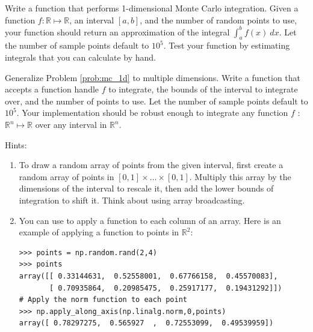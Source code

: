 \begin{problem}
\label{prob:mc_1d}
Write a function that performs 1-dimensional Monte Carlo integration. 
Given a function $f: \mathbb{R} \mapsto \mathbb{R}$, an interval ${[a,b]}$, and the number of random points to use, your function should return an approximation of the integral
$\int_a^b f(x)\:dx$.
Let the number of sample points default to $10^5$.
Test your function by estimating integrals that you can calculate by hand.

\end{problem}



\begin{problem}
\label{prob:mc}
Generalize Problem \ref{prob:mc_1d} to multiple dimensions. 
Write a function that accepts a function handle $f$ to integrate, the bounds of the interval to integrate over, and the number of points to use. 
Let the number of sample points default to $10^5$.
Your implementation should be robust enough to integrate any function $f$ : $\mathbb{R}^n \mapsto \mathbb{R}$ over any interval in $\mathbb{R}^n$.


Hints:
\begin{enumerate}
\item To draw a random array of points from the given interval, first create a random array of points in $[0,1] \times \ldots \times [0,1]$.
Multiply this array by the dimensions of the interval to rescale it, then add the lower bounds of integration to shift it.
Think about using array broadcasting.

\item You can use  to apply a function to each column of an array. 
Here is an example of applying a function to points in $\mathbb{R}^2$:

\begin{lstlisting}
>>> points = np.random.rand(2,4)
>>> points
array([[ 0.33144631,  0.52558001,  0.67766158,  0.45570083],
       [ 0.70935864,  0.20985475,  0.25917177,  0.19431292]])
# Apply the norm function to each point
>>> np.apply_along_axis(np.linalg.norm,0,points)
array([ 0.78297275,  0.565927  ,  0.72553099,  0.49539959])
\end{lstlisting}


\end{enumerate}
\end{problem}
